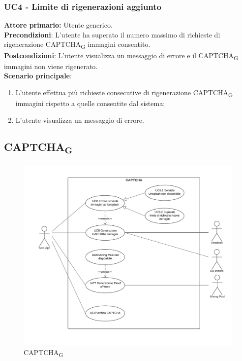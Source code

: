 \subsubsection{UC4 - Limite di rigenerazioni aggiunto}
\textbf{Attore primario:} Utente generico.\\
\textbf{Precondizioni}: L'utente ha superato il numero massimo di richieste di rigenerazione CAPTCHA\textsubscript{G} immagini consentito.\\
\textbf{Postcondizioni}: L’utente visualizza un messaggio di errore e il CAPTCHA\textsubscript{G} immagini non viene rigenerato.\\

\textbf{Scenario principale}:
\begin{enumerate}
    \item L'utente effettua più richieste consecutive di rigenerazione CAPTCHA\textsubscript{G} immagini rispetto a quelle consentite dal sistema;
	\item L’utente visualizza un messaggio di errore.
\end{enumerate}

\subsection{CAPTCHA\textsubscript{G}}

\begin{figure}[H]
    \centering
    \includegraphics[scale=0.6]{img/captcha.png}
    \caption{CAPTCHA\textsubscript{G}}
\end{figure}


